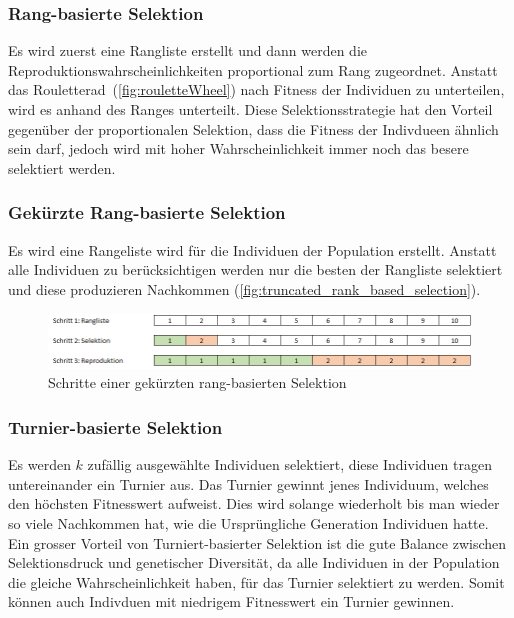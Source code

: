       \subsubsection{Rang-basierte Selektion}

        Es wird zuerst eine Rangliste erstellt und dann werden die Reproduktionswahrscheinlichkeiten proportional zum Rang zugeordnet.
        Anstatt das Rouletterad~(\vref{fig:rouletteWheel}) nach Fitness der Individuen zu unterteilen, wird es anhand des Ranges unterteilt.
        Diese Selektionsstrategie hat den Vorteil gegenüber der proportionalen Selektion,
        dass die Fitness der Indivdueen ähnlich sein darf, jedoch wird mit hoher Wahrscheinlichkeit immer noch das besere selektiert werden.

      \subsubsection{Gekürzte Rang-basierte Selektion}

        Es wird eine Rangeliste wird für die Individuen der Population erstellt.
        Anstatt alle Individuen zu berücksichtigen werden nur die besten der Rangliste selektiert und diese produzieren Nachkommen (\vref{fig:truncated_rank_based_selection}).

        \begin{figure}[H]
          \includegraphics[scale=0.7, center]{graphics/truncated_rank_based_selection}
          \caption{Schritte einer gekürzten rang-basierten Selektion\label{fig:truncated_rank_based_selection}}
        \end{figure}


      \subsubsection{Turnier-basierte Selektion\label{par:Turnier}}

        Es werden \(k\) zufällig ausgewählte Individuen selektiert, diese Individuen tragen untereinander ein Turnier aus.
        Das Turnier gewinnt jenes Individuum, welches den höchsten Fitnesswert aufweist.
        Dies wird solange wiederholt bis man wieder so viele Nachkommen hat,
        wie die Ursprüngliche Generation Individuen hatte.
        Ein grosser Vorteil von Turniert-basierter Selektion ist die gute Balance zwischen
        Selektionsdruck und genetischer Diversität, da alle Individuen in der Population die gleiche Wahrscheinlichkeit haben, für das Turnier selektiert zu werden.
        Somit können auch Indivduen mit niedrigem Fitnesswert ein Turnier gewinnen.


